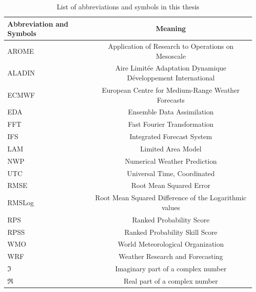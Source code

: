 \begin{table}[h]
    \footnotesize
    \centering
        \begin{tabular}{|l|c|}
        \hline
        \textbf{Abbreviation and Symbols}&\textbf{Meaning}\\
        \hline
        \hline
        AROME&Application of Research to Operations on Mesoscale\\
        \hline
        ALADIN& Aire Limitée Adaptation Dynamique Développement International\\
        \hline
        ECMWF& European Centre for Medium-Range Weather Forecasts\\
        \hline
        EDA & Ensemble Data Assimilation\\
        \hline
        FFT & Fast Fourier Transformation\\
        \hline
        IFS&Integrated Forecast System \\
        \hline
        LAM&Limited Area Model \\
        \hline
        NWP & Numerical Weather Prediction\\
        \hline
        UTC & Universal Time, Coordinated\\
        \hline
        RMSE& Root Mean Squared Error\\
        \hline
        RMSLog & Root Mean Squared Difference of the Logarithmic values\\
        \hline
        RPS & Ranked Probability Score\\
        \hline
        RPSS & Ranked Probability Skill Score\\
        \hline
        WMO& World Meteorological Organization\\
        \hline
        WRF& Weather Research and Forecasting\\
        \hline
        $\Im$ & Imaginary part of a complex number\\
        \hline
        $\Re$ & Real part of a complex number\\
        \hline
        
    
    \end{tabular}
    \caption{List of abbreviations and symbols in this thesis}
    \label{tab:abbrivitations}
\end{table}

